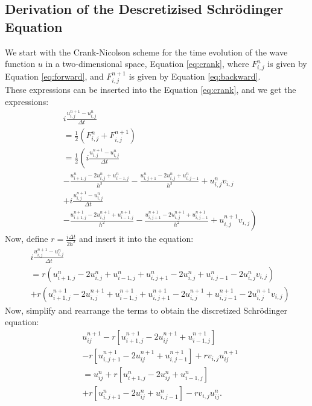 \documentclass[10pt, nofootinbib, twocolumn]{revtex4-1}
\begin{document}
\subsection{Derivation of the Descretizised Schrödinger Equation}\label{sec:derivation}
We start with the Crank-Nicolson scheme for the time evolution of the wave function \(u\) in a two-dimensional space, Equation \eqref{eq:crank}, where \(F_{i,j}^n\) is given by Equation \eqref{eq:forward}, and \(F_{i,j}^{n+1}\) is given by Equation \eqref{eq:backward}. \\
These expressions can be inserted into the Equation \eqref{eq:crank}, and we get the expressions:
\[
\begin{aligned}
    &i \frac{u^{n+1}_{i,j}-u^{n}_{i,j}}{\Delta t} \\
    &= \frac{1}{2}(F_{i,j}^{n}+F_{i,j}^{n+1})\\
    &=\frac{1}{2}\left(i \frac{u^{n+1}_{i,j}-u^{n}_{i,j}}{\Delta t} \right. \\
    &- \left.\frac{u^n_{i+1,j}-2u^n_{i,j}+u^n_{i-1,j}}{h^2} - \frac{u^n_{i,j+1}-2u^n_{i,j}+u^n_{i,j-1} }{h^2} + u^n_{i,j}v_{i,j}\right.\\
    &+ \left.i \frac{u^{n+1}_{i,j}-u^{n}_{i,j}}{\Delta t} \right. \\
    &- \left.\frac{u^{n+1}_{i+1,j}- 2u^{n+1}_{i,j}+u^{n+1}_{i-1,j}}{h^2} - \frac{u^{n+1}_{i,j+1}-2u^{n+1}_{i,j}+u^{n+1}_{i,j-1} }{h^2} + u^{n+1}_{i,j}v_{i,j}\right)
\end{aligned}
\]
Now, define \(r = \frac{i \Delta t}{2h^2}\) and insert it into the equation:
\[
\begin{aligned}
    &i \frac{u^{n+1}_{i,j}-u^{n}_{i,j}}{\Delta t} \\
    &= r\left(u^n_{i+1,j}-2u^n_{i,j}+u^n_{i-1,j} + u^n_{i,j+1}-2u^n_{i,j}+u^n_{i,j-1} - 2u^n_{i,j}v_{i,j}\right)\\
    &+ r\left(u^{n+1}_{i+1,j}-2u^{n+1}_{i,j}+u^{n+1}_{i-1,j} + u^{n+1}_{i,j+1}-2u^{n+1}_{i,j}+u^{n+1}_{i,j-1} - 2u^{n+1}_{i,j}v_{i,j}\right)
\end{aligned}
\]
Now, simplify and rearrange the terms to obtain the discretized Schrödinger equation:
\[
\begin{aligned}
    &u_{ij}^{n+1} - r\left[u_{i+1,j}^{n+1} - 2u_{ij}^{n+1} + u_{i-1,j}^{n+1}\right] \\
    &- r\left[u_{i,j+1}^{n+1} - 2u_{ij}^{n+1} + u_{i,j-1}^{n+1}\right] + r v_{i,j} u_{ij}^{n+1} \\
    &= u_{ij}^n + r\left[u_{i+1,j}^n - 2u_{ij}^n + u_{i-1,j}^n\right] \\
    &+ r\left[u_{i,j+1}^n - 2u_{ij}^n + u_{i,j-1}^n\right] - r v_{i,j} u_{ij}^n.
\end{aligned}
\]
\end{document}
